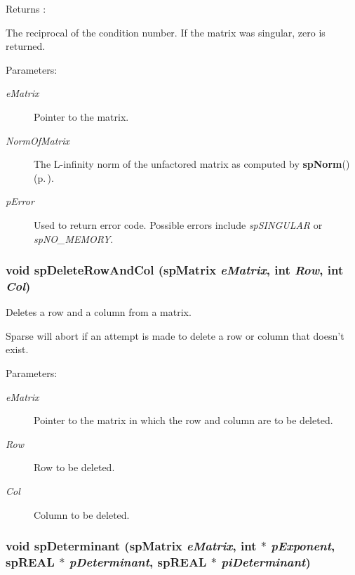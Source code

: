\begin{Desc}
\item[Returns :]\par
 The reciprocal of the condition number. If the matrix was singular, zero is returned.\end{Desc}
\begin{Desc}
\item[Parameters: ]\par
\begin{description}
\item[{\em 
e\-Matrix}]Pointer to the matrix. \item[{\em 
Norm\-Of\-Matrix}]The L-infinity norm of the unfactored matrix as computed by {\bf sp\-Norm}() {\rm (p.\,\pageref{spUtils_8c_a21})}. \item[{\em 
p\-Error}]Used to return error code. Possible errors include {\em sp\-SINGULAR} or {\em sp\-NO\_\-MEMORY}. \end{description}
\end{Desc}
\subsubsection{\setlength{\rightskip}{0pt plus 5cm}void sp\-Delete\-Row\-And\-Col ({\bf sp\-Matrix} {\em e\-Matrix}, int {\em Row}, int {\em Col})}\label{spUtils_8c_a18}


Deletes a row and a column from a matrix.

Sparse will abort if an attempt is made to delete a row or column that doesn't exist.\begin{Desc}
\item[Parameters: ]\par
\begin{description}
\item[{\em 
e\-Matrix}]Pointer to the matrix in which the row and column are to be deleted. \item[{\em 
Row}]Row to be deleted. \item[{\em 
Col}]Column to be deleted. \end{description}
\end{Desc}
\subsubsection{\setlength{\rightskip}{0pt plus 5cm}void sp\-Determinant ({\bf sp\-Matrix} {\em e\-Matrix}, int $\ast$ {\em p\-Exponent}, sp\-REAL $\ast$ {\em p\-Determinant}, sp\-REAL $\ast$ {\em pi\-Determinant})}\label{spUtils_8c_a16}


